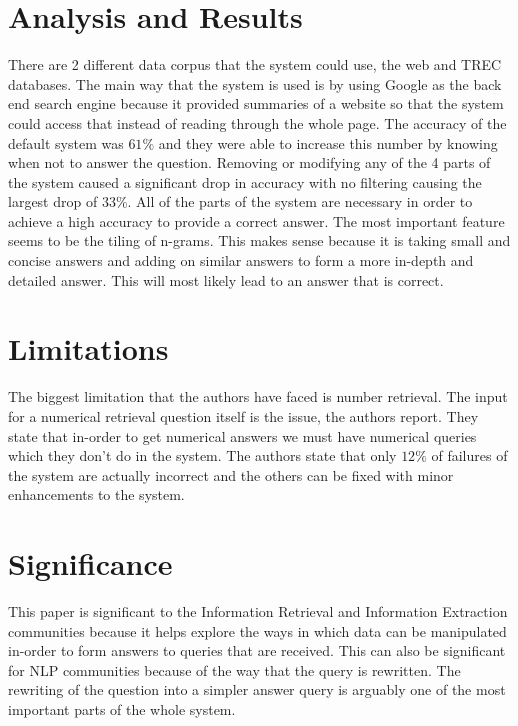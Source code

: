 \documentclass[journal, a4paper]{IEEEtran}
\begin{document}


\section{Analysis and Results}
There are 2 different data corpus that the system could use, the web and TREC databases. The main way that the system is used is by using Google as the back end search engine because it provided summaries of a website so that the system could access that instead of reading through the whole page. The accuracy of the default system was $61\%$ and they were able to increase this number by knowing when not to answer the question. Removing or modifying any of the 4 parts of the system caused a significant drop in accuracy with no filtering causing the largest drop of $33\%$. All of the parts of the system are necessary in order to achieve a high accuracy to provide a correct answer. The most important feature seems to be the tiling of n-grams. This makes sense because it is taking small and concise answers and adding on similar answers to form a more in-depth and detailed answer. This will most likely lead to an answer that is correct.

\section{Limitations}
The biggest limitation that the authors have faced is number retrieval. The input for a numerical retrieval question itself is the issue, the authors report. They state that in-order to get numerical answers we must have numerical queries which they don't do in the system. The authors state that only $12\%$ of failures of the system are actually incorrect and the others can be fixed with minor enhancements to the system.  

\section{Significance}
This paper is significant to the Information Retrieval and Information Extraction communities because it helps explore the ways in which data can be manipulated in-order to form answers to queries that are received. This can also be significant for NLP communities because of the way that the query is rewritten. The rewriting of the question into a simpler answer query is arguably one of the most important parts of the whole system.
\end{document}
